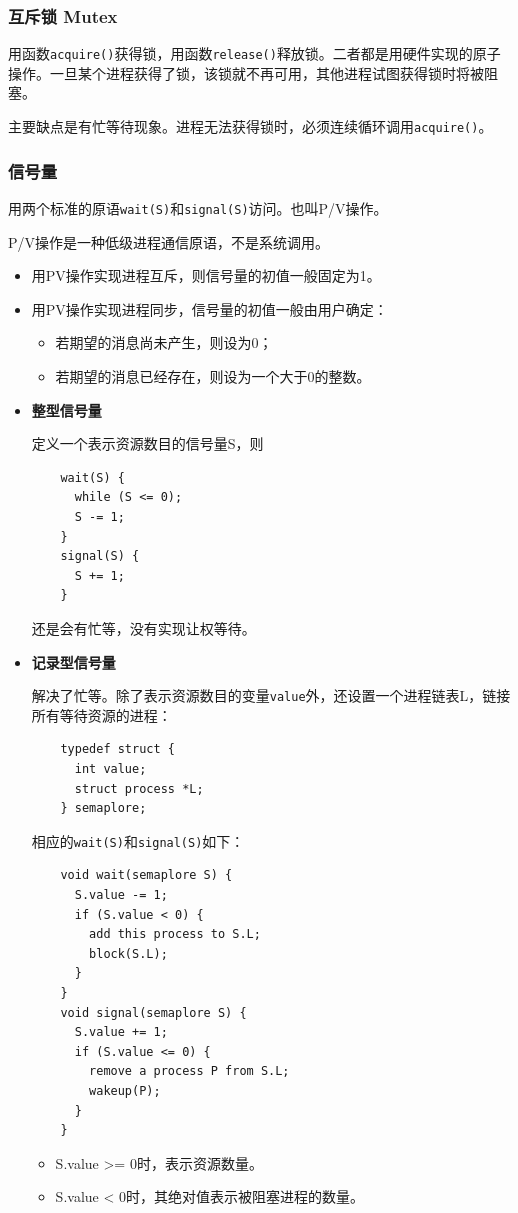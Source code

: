\documentclass[12pt, a4paper, oneside]{ctexart}
\begin{document}
\subsubsection{互斥锁 Mutex}

用函数\verb|acquire()|获得锁，用函数\verb|release()|释放锁。二者都是用硬件实现的原子操作。一旦某个进程获得了锁，该锁就不再可用，其他进程试图获得锁时将被阻塞。

主要缺点是有忙等待现象。进程无法获得锁时，必须连续循环调用\verb|acquire()|。

\subsubsection{信号量}

用两个标准的原语\verb|wait(S)|和\verb|signal(S)|访问。也叫P/V操作。

P/V操作是一种低级进程通信原语，不是系统调用。

\begin{itemize}
  \item 用PV操作实现进程互斥，则信号量的初值一般固定为1。
  \item 用PV操作实现进程同步，信号量的初值一般由用户确定：
  \begin{itemize}
    \item 若期望的消息尚未产生，则设为0；
    \item 若期望的消息已经存在，则设为一个大于0的整数。
  \end{itemize}
\end{itemize}

\begin{itemize}
  \item {\bf 整型信号量}
  
  定义一个表示资源数目的信号量S，则
  \begin{lstlisting}
    wait(S) {
      while (S <= 0);
      S -= 1;
    }
    signal(S) {
      S += 1;
    }
  \end{lstlisting}
  还是会有忙等，没有实现让权等待。
  \item {\bf 记录型信号量}
  
  解决了忙等。除了表示资源数目的变量\verb|value|外，还设置一个进程链表L，链接所有等待资源的进程：
  \begin{lstlisting}
    typedef struct {
      int value;
      struct process *L;
    } semaplore;
  \end{lstlisting}
  相应的\verb|wait(S)|和\verb|signal(S)|如下：
  \begin{lstlisting}
    void wait(semaplore S) {
      S.value -= 1;
      if (S.value < 0) {
        add this process to S.L;
        block(S.L);
      }
    }
    void signal(semaplore S) {
      S.value += 1;
      if (S.value <= 0) {
        remove a process P from S.L;
        wakeup(P);
      }
    }
  \end{lstlisting}
  \begin{itemize}
    \item S.value >= 0时，表示资源数量。
    \item S.value < 0时，其绝对值表示被阻塞进程的数量。
  \end{itemize}
\end{itemize}
\end{document}
